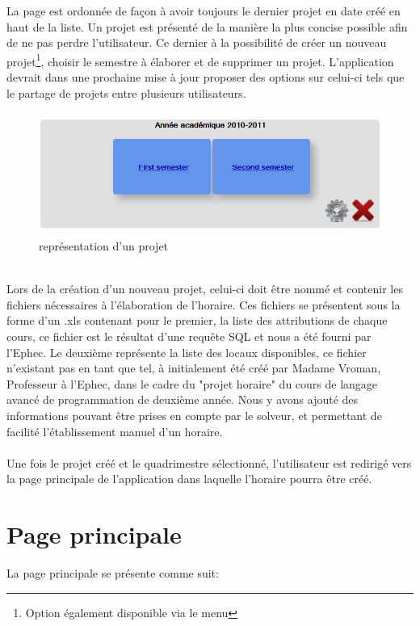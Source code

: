 La page est ordonnée de façon à avoir toujours le dernier projet en date créé en haut de la liste. Un projet est présenté de la manière la plus concise possible afin de ne pas perdre l'utilisateur. Ce dernier à la possibilité de créer un nouveau projet\footnote{Option également disponible via le menu}, choisir le semestre à élaborer et de supprimer un projet. L'application devrait dans une prochaine mise à jour proposer des options sur celui-ci tels que le partage de projets entre plusieurs utilisateurs.\\
\begin{figure}[!h]
	\begin{center}
	\includegraphics[width=12cm,height=4cm]{project.png}	
	\caption{représentation d'un projet}
\end{center}
\end{figure}
\\Lors de la création d'un nouveau projet, celui-ci doit être nommé et contenir les fichiers nécessaires à l'élaboration de l'horaire. Ces fichiers se présentent sous la forme d'un .xls contenant pour le premier, la liste des attributions de chaque cours, ce fichier est le résultat d'une requête SQL et nous a été fourni par l'Ephec. Le deuxième représente la liste des locaux disponibles, ce fichier n'existant pas en tant que tel, à initialement été créé par Madame Vroman, Professeur à l'Ephec, dans le cadre du "projet horaire" du cours de langage avancé de programmation de deuxième année. Nous y avons ajouté des informations pouvant être prises en compte par le solveur, et permettant de facilité l'établissement manuel d'un horaire.\\
\\
Une fois le projet créé et le quadrimestre sélectionné, l'utilisateur est redirigé vers la page principale de l'application dans laquelle l'horaire pourra être créé.

\section{Page principale}
La page principale se présente comme suit:\\


